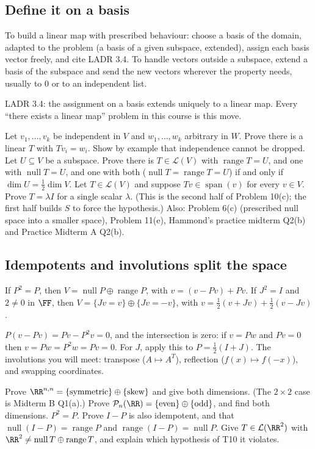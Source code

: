 \documentclass[11pt]{scrartcl}
\DeclareMathOperator{\nul}{null}
\DeclareMathOperator{\range}{range}
\DeclareMathOperator{\spn}{span}
\newcommand{\LL}{\mathcal L}
\newcommand{\PP}{\mathcal P}
\begin{document}
\subsection{Define it on a basis}
\begin{theorem*}[T9]
  To build a linear map with prescribed behaviour: choose a basis of the domain, adapted to the problem (a basis of a given subspace, extended), assign each basis vector freely, and cite LADR 3.4.
  To handle vectors outside a subspace, extend a basis of the subspace and send the new vectors wherever the property needs, usually to $0$ or to an independent list.
\end{theorem*}
\why LADR 3.4: the assignment on a basis extends uniquely to a linear map. Every ``there exists a linear map'' problem in this course is this move.
\probs
\begin{enumerate}[(a)]
  \ii Let $v_1,\dots,v_k$ be independent in $V$ and $w_1,\dots,w_k$ arbitrary in $W$. Prove there is a linear $T$ with $Tv_i=w_i$. Show by example that independence cannot be dropped.
  \ii Let $U\subseteq V$ be a subspace. Prove there is $T\in\LL(V)$ with $\range T=U$, and one with $\nul T=U$, and one with both ($\nul T=\range T=U$) if and only if $\dim U=\frac12\dim V$.
  \ii Let $T\in\LL(V)$ and suppose $Tv\in\spn(v)$ for every $v\in V$. Prove $T=\lambda I$ for a single scalar $\lambda$. (This is the second half of Problem 10(c); the first half builds $S$ to force the hypothesis.)
  \ii Also: Problem 6(c) (prescribed null space into a smaller space), Problem 11(e), Hammond's practice midterm Q2(b) and Practice Midterm A Q2(b).
\end{enumerate}

\subsection{Idempotents and involutions split the space}
\begin{theorem*}[T10]
  If $P^2=P$, then $V=\nul P\oplus\range P$, with $v=(v-Pv)+Pv$.
  If $J^2=I$ and $2\ne0$ in $\FF$, then $V=\{Jv=v\}\oplus\{Jv=-v\}$, with $v=\tfrac12(v+Jv)+\tfrac12(v-Jv)$.
\end{theorem*}
\why $P(v-Pv)=Pv-P^2v=0$, and the intersection is zero: if $v=Pw$ and $Pv=0$ then $v=Pw=P^2w=Pv=0$. For $J$, apply this to $P=\tfrac12(I+J)$.
The involutions you will meet: transpose ($A\mapsto A^T$), reflection ($f(x)\mapsto f(-x)$), and swapping coordinates.
\probs
\begin{enumerate}[(a)]
  \ii Prove $\RR^{n,n}=\{\text{symmetric}\}\oplus\{\text{skew}\}$ and give both dimensions. (The $2\times2$ case is Midterm B Q1(a).)
  \ii Prove $\PP_n(\RR)=\{\text{even}\}\oplus\{\text{odd}\}$, and find both dimensions.
  \ii $P^2=P$. Prove $I-P$ is also idempotent, and that $\nul(I-P)=\range P$ and $\range(I-P)=\nul P$.
  \ii Give $T\in\LL(\RR^2)$ with $\RR^2\ne\nul T\oplus\range T$, and explain which hypothesis of T10 it violates.
\end{enumerate}
\end{document}
